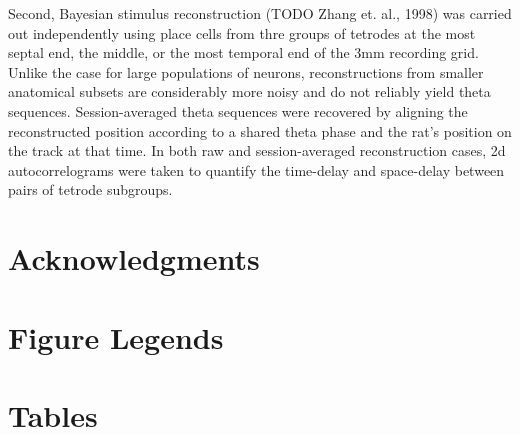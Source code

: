 \documentclass[10pt]{article}
\begin{document}
Second, Bayesian stimulus reconstruction (TODO Zhang et. al., 1998) was carried out independently using place cells from thre groups of tetrodes at the most septal end, the middle, or the most temporal end of the 3mm recording grid. Unlike the case for large populations of neurons, reconstructions from smaller anatomical subsets are considerably more noisy and do not reliably yield theta sequences. Session-averaged theta sequences were recovered by aligning the reconstructed position according to a shared theta phase and the rat's position on the track at that time. In both raw and session-averaged reconstruction cases, 2d autocorrelograms were taken to quantify the time-delay and space-delay between pairs of tetrode subgroups.


\section*{Acknowledgments}




\section*{Figure Legends}


\section*{Tables}
\end{document}
